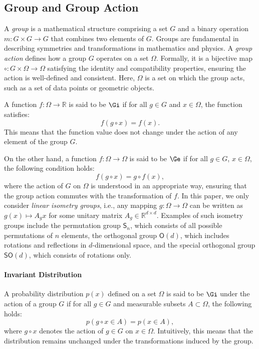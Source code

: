\subsection{Group and Group Action}

A \emph{group} is a mathematical structure comprising a set \( G \) and a binary operation \( m : G \times G \to G \) that combines two elements of \( G \). Groups are fundamental in describing symmetries and transformations in mathematics and physics. A \emph{group action} defines how a group \( G \) operates on a set \( \Omega \). Formally, it is a bijective map \( \circ : G \times \Omega \to \Omega \) satisfying the identity and compatibility properties, ensuring the action is well-defined and consistent. Here, \( \Omega \) is a set on which the group acts, such as a set of data points or geometric objects.


A function \( f : \Omega \to \mathbb{R} \) is said to be \(\Gi\) if for all \( g \in G \) and \( x \in \Omega \), the function satisfies:
\[
f(g \circ x) = f(x).
\]
This means that the function value does not change under the action of any element of the group \( G \).

On the other hand, a function \( f : \Omega \to \Omega \) is said to be \(\Ge\) if for all \( g \in G \), \( x \in \Omega \), the following condition holds:
\[
f(g \circ x) = g \circ f(x),
\]
where the action of \( G \) on \( \Omega \) is understood in an appropriate way, ensuring that the group action commutes with the transformation of \( f \). In this paper, we only consider \textit{linear isometry groups}, i.e., any mapping \( g : \Omega \to \Omega \) can be written as \( g(x) \mapsto A_gx \) for some unitary matrix \( A_g \in \mathbb{R}^{d \times d} \). Examples of such isometry groups include the permutation group \( \mathsf{S}_n \), which consists of all possible permutations of \( n \) elements, the orthogonal group \( \mathsf{O}(d) \), which includes rotations and reflections in \( d \)-dimensional space, and the special orthogonal group \( \mathsf{SO}(d) \), which consists of rotations only. 

\paragraph{Invariant Distribution} 
A probability distribution \( p(x) \) defined on a set \( \Omega \) is said to be \(\Gi\) under the action of a group \( G \) if for all \( g \in G \) and measurable subsets \( A \subset \Omega \), the following holds:
\[
p(g \circ x \in A) = p(x \in A),
\]
where \( g \circ x \) denotes the action of \( g \in G \) on \( x \in \Omega \). Intuitively, this means that the distribution remains unchanged under the transformations induced by the group.

